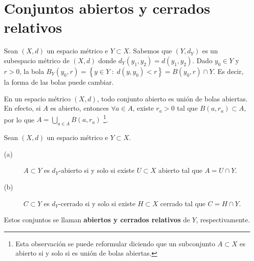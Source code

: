 \section{Conjuntos abiertos y cerrados relativos}
\begin{observation}
Sean $\displaystyle \left(X,d\right) $ un espacio métrico e $\displaystyle Y \subset X $. Sabemos que $\displaystyle \left(Y, d _{Y}\right) $ es un subespacio métrico de $\displaystyle \left(X,d\right) $ donde $\displaystyle d _{Y}\left(y_{1}, y_{2}\right) = d\left(y_{1}, y_{2}\right) $. 
Dado $\displaystyle y_{0} \in Y $ y $\displaystyle r > 0 $, la bola $\displaystyle B_{Y}\left(y_{0}, r\right) = \left\{ y \in Y \; : \; d\left(y, y_{0}\right)<r\right\} = B\left(y_{0}, r\right) \cap Y $. Es decir, la forma de las bolas puede cambiar.
\end{observation}
\begin{observation}
En un espacio métrico $\displaystyle \left(X,d\right) $, todo conjunto abierto es unión de bolas abiertas. En efecto, si $\displaystyle A $ es abierto, entonces $\displaystyle \forall a \in A $, existe $\displaystyle r_{a} > 0 $ tal que $\displaystyle B\left(a,r_{a}\right) \subset A $, por lo que $\displaystyle A = \bigcup_{ a \in A}B\left(a,r_{a}\right) $ \footnote{Esta observación se puede reformular diciendo que un subconjunto $\displaystyle A \subset X $ es abierto si y solo si es unión de bolas abiertas.}.
\end{observation}
\begin{prop}
Sean $\displaystyle \left(X,d\right) $ un espacio métrico e $\displaystyle Y \subset X $. 
\begin{description}
\item[(a)] $\displaystyle A \subset Y $ es $\displaystyle d _{Y} $-abierto si y solo si existe $\displaystyle U \subset X $ abierto tal que $\displaystyle A = U \cap Y $.
\item[(b)] $\displaystyle C \subset Y $ es $\displaystyle d _{Y} $-cerrado si y solo si existe $\displaystyle H \subset X $ cerrado tal que $\displaystyle C = H \cap Y $.
\end{description}
Estos conjuntos se llaman \textbf{abiertos y cerrados relativos} de $\displaystyle Y $, respectivamente.
\end{prop}
